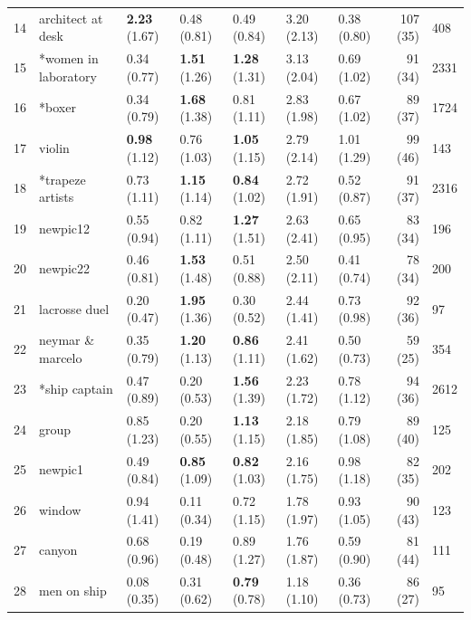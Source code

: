 \documentclass[man,a4paper,mask]{apa6}\usepackage[]{graphicx}\usepackage[]{color}
\begin{document}
\begin{table}
\begin{threeparttable}
\begin{tabularx}{\textwidth}{rllllllr}
   14 & architect at desk & \textbf{2.23} (1.67) & 0.48 (0.81) & 0.49 (0.84) & 3.20 (2.13) & 0.38 (0.80) & 107 (35) & 408 \\ 
   15 & *women in laboratory & 0.34 (0.77) & \textbf{1.51} (1.26) & \textbf{1.28} (1.31) & 3.13 (2.04) & 0.69 (1.02) & 91 (34) & 2331 \\ 
   16 & *boxer & 0.34 (0.79) & \textbf{1.68} (1.38) & 0.81 (1.11) & 2.83 (1.98) & 0.67 (1.02) & 89 (37) & 1724 \\ 
   17 & violin & \textbf{0.98} (1.12) & 0.76 (1.03) & \textbf{1.05} (1.15) & 2.79 (2.14) & 1.01 (1.29) & 99 (46) & 143 \\ 
   18 & *trapeze artists & 0.73 (1.11) & \textbf{1.15} (1.14) & \textbf{0.84} (1.02) & 2.72 (1.91) & 0.52 (0.87) & 91 (37) & 2316 \\ 
   19 & newpic12 & 0.55 (0.94) & 0.82 (1.11) & \textbf{1.27} (1.51) & 2.63 (2.41) & 0.65 (0.95) & 83 (34) & 196 \\ 
   20 & newpic22 & 0.46 (0.81) & \textbf{1.53} (1.48) & 0.51 (0.88) & 2.50 (2.11) & 0.41 (0.74) & 78 (34) & 200 \\ 
   21 & lacrosse duel & 0.20 (0.47) & \textbf{1.95} (1.36) & 0.30 (0.52) & 2.44 (1.41) & 0.73 (0.98) & 92 (36) &  97 \\ 
   22 & neymar \& marcelo & 0.35 (0.79) & \textbf{1.20} (1.13) & \textbf{0.86} (1.11) & 2.41 (1.62) & 0.50 (0.73) & 59 (25) & 354 \\ 
   23 & *ship captain & 0.47 (0.89) & 0.20 (0.53) & \textbf{1.56} (1.39) & 2.23 (1.72) & 0.78 (1.12) & 94 (36) & 2612 \\ 
   24 & group & 0.85 (1.23) & 0.20 (0.55) & \textbf{1.13} (1.15) & 2.18 (1.85) & 0.79 (1.08) & 89 (40) & 125 \\ 
   25 & newpic1 & 0.49 (0.84) & \textbf{0.85} (1.09) & \textbf{0.82} (1.03) & 2.16 (1.75) & 0.98 (1.18) & 82 (35) & 202 \\ 
   26 & window & 0.94 (1.41) & 0.11 (0.34) & 0.72 (1.15) & 1.78 (1.97) & 0.93 (1.05) & 90 (43) & 123 \\ 
   27 & canyon & 0.68 (0.96) & 0.19 (0.48) & 0.89 (1.27) & 1.76 (1.87) & 0.59 (0.90) & 81 (44) & 111 \\ 
   28 & men on ship & 0.08 (0.35) & 0.31 (0.62) & \textbf{0.79} (0.78) & 1.18 (1.10) & 0.36 (0.73) & 86 (27) &  95 \\ 
   \hline


\end{tabularx}
\end{threeparttable}
\end{table}
\end{document}
